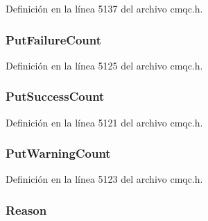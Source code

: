 Definición en la línea 5137 del archivo cmqc.\+h.

\hypertarget{structtag_m_q_s_t_s_a7588d679d3d79c069fdf82aeae32fede}{}
\subsubsection[{Put\+Failure\+Count}]{ Put\+Failure\+Count}\label{structtag_m_q_s_t_s_a7588d679d3d79c069fdf82aeae32fede}


Definición en la línea 5125 del archivo cmqc.\+h.

\hypertarget{structtag_m_q_s_t_s_a4577d49eab12e56cd487d84e5179beb9}{}
\subsubsection[{Put\+Success\+Count}]{ Put\+Success\+Count}\label{structtag_m_q_s_t_s_a4577d49eab12e56cd487d84e5179beb9}


Definición en la línea 5121 del archivo cmqc.\+h.

\hypertarget{structtag_m_q_s_t_s_a6a179f500b4a403e9609416d7c9cdcc0}{}
\subsubsection[{Put\+Warning\+Count}]{ Put\+Warning\+Count}\label{structtag_m_q_s_t_s_a6a179f500b4a403e9609416d7c9cdcc0}


Definición en la línea 5123 del archivo cmqc.\+h.

\hypertarget{structtag_m_q_s_t_s_ac2f0378cb0c66c5f91625822e53d7bae}{}
\subsubsection[{Reason}]{ Reason}\label{structtag_m_q_s_t_s_ac2f0378cb0c66c5f91625822e53d7bae}


